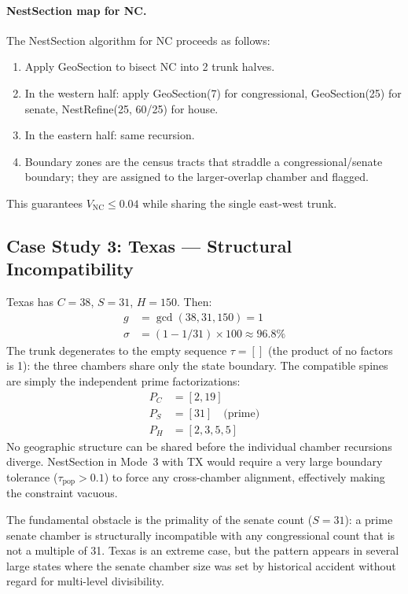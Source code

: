 \paragraph{NestSection map for NC.}
The NestSection algorithm for NC proceeds as follows:
\begin{enumerate}
  \item Apply GeoSection to bisect NC into 2 trunk halves.
  \item In the western half: apply GeoSection(7) for congressional, GeoSection(25)
        for senate, NestRefine(25, 60/25) for house.
  \item In the eastern half: same recursion.
  \item Boundary zones are the census tracts that straddle a congressional/senate
        boundary; they are assigned to the larger-overlap chamber and flagged.
\end{enumerate}
This guarantees $V_\text{NC} \leq 0.04$ while sharing the single east-west trunk.

\subsection{Case Study 3: Texas --- Structural Incompatibility}

Texas has $C = 38$, $S = 31$, $H = 150$.  Then:
\begin{align*}
  g &= \gcd(38, 31, 150) = 1 \\
  \sigma &= (1 - 1/31) \times 100 \approx 96.8\%
\end{align*}
The trunk degenerates to the empty sequence $\tau = []$ (the product of no
factors is 1): the three chambers share only the state boundary.  The
compatible spines are simply the independent prime factorizations:
\begin{align*}
  P_C &= [2, 19] \\
  P_S &= [31] \quad\text{(prime)} \\
  P_H &= [2, 3, 5, 5]
\end{align*}
No geographic structure can be shared before the individual chamber
recursions diverge.  NestSection in Mode~3 with TX would require a very
large boundary tolerance ($\tau_\text{pop} > 0.1$) to force any
cross-chamber alignment, effectively making the constraint vacuous.

The fundamental obstacle is the primality of the senate count ($S = 31$):
a prime senate chamber is structurally incompatible with any congressional
count that is not a multiple of 31.  Texas is an extreme case, but the
pattern appears in several large states where the senate chamber size was
set by historical accident without regard for multi-level divisibility.


